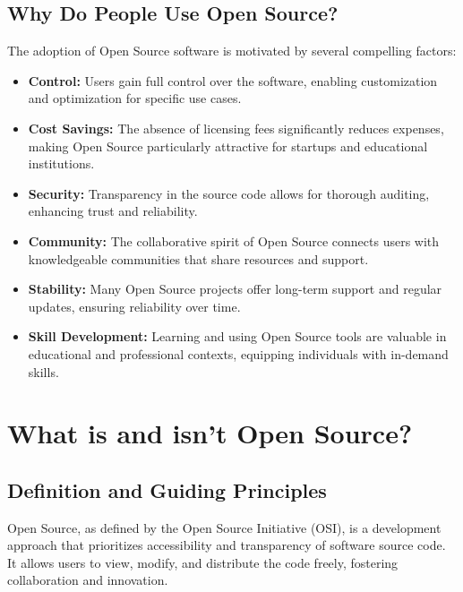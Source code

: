 \cite{advantages-of-open-source-software}
\cite{Pros-and-cons-of-open-source-software}

\subsection{Why Do People Use Open Source?}

The adoption of Open Source software is motivated by several compelling factors:

\begin{itemize}
    \item \textbf{Control:} Users gain full control over the software, enabling customization and optimization for specific use cases.
    \item \textbf{Cost Savings:} The absence of licensing fees significantly reduces expenses, making Open Source particularly attractive for startups and educational institutions.
    \item \textbf{Security:} Transparency in the source code allows for thorough auditing, enhancing trust and reliability.
    \item \textbf{Community:} The collaborative spirit of Open Source connects users with knowledgeable communities that share resources and support.
    \item \textbf{Stability:} Many Open Source projects offer long-term support and regular updates, ensuring reliability over time.
    \item \textbf{Skill Development:} Learning and using Open Source tools are valuable in educational and professional contexts, equipping individuals with in-demand skills.
\end{itemize}



%
%


\section{What is and isn’t Open Source?}

\subsection{Definition and Guiding Principles}

Open Source, as defined by the Open Source Initiative (OSI), is a development approach that prioritizes accessibility and transparency of software source code. It allows users to view, modify, and distribute the code freely, fostering collaboration and innovation. 

